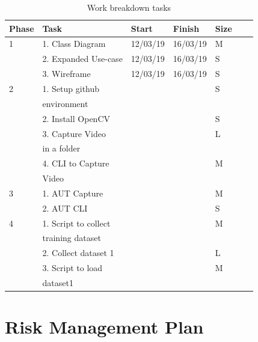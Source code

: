 \documentclass[12pt,a4paper,man]{report}
\begin{document}
\begin{table}[htbp]
\caption{\label{table:wbs_table}
Work breakdown tasks}
\centering
\begin{tabular}{|l|l|l|l|l|lp{3cm}|}
\hline
\textbf{Phase} & \textbf{Task} & \textbf{Start} & \textbf{Finish} & \textbf{Size}\\
\hline
1 & 1. Class Diagram & 12/03/19 & 16/03/19 & M\\
 & 2. Expanded Use-case & 12/03/19 & 16/03/19 & S\\
 & 3. Wireframe & 12/03/19 & 16/03/19 & S\\
\hline
2 & 1. Setup github &  &  & S\\
 & environment &  &  & \\
 & 2. Install OpenCV &  &  & S\\
 & 3. Capture Video &  &  & L\\
 & in a folder &  &  & \\
 & 4. CLI to Capture &  &  & M\\
 & Video &  &  & \\
\hline
3 & 1. AUT Capture &  &  & M\\
 & 2. AUT CLI &  &  & S\\
\hline
4 & 1. Script to collect &  &  & M\\
 & training dataset &  &  & \\
 & 2. Collect dataset 1 &  &  & L\\
 & 3. Script to load &  &  & M\\
 & dataset1 &  &  & \\
\hline
\end{tabular}
\end{table}



\chapter{Risk Management Plan}
\label{sec:orgb6be8a8}
\end{document}
